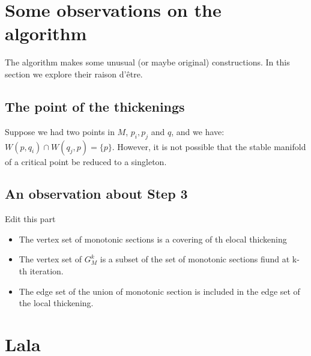 \section{Some observations on the algorithm}

The algorithm makes some unusual (or maybe original) constructions. In this
section we explore their raison d'\^etre.

\subsection{The point of the thickenings}

Suppose we had two points in $M$, $p_i,p_j$ and $q$, 
and we have: $W(p,q_i)\cap W(q_j,p)=\{p\}$.
However, it is not possible that the stable manifold of a critical point be reduced to a
singleton.

\subsection{An observation about Step 3}

{\color{red} Edit this part}
\begin{itemize}
    \item The vertex set of monotonic sections is a covering of th elocal thickening
        
    \item  The vertex set of $G_M^k$ is a subset of the set of monotonic sections fiund at k-th iteration.

    \item The edge set of the union of monotonic section is included in the edge set of the local thickening.
\end{itemize}


\section{Lala}
